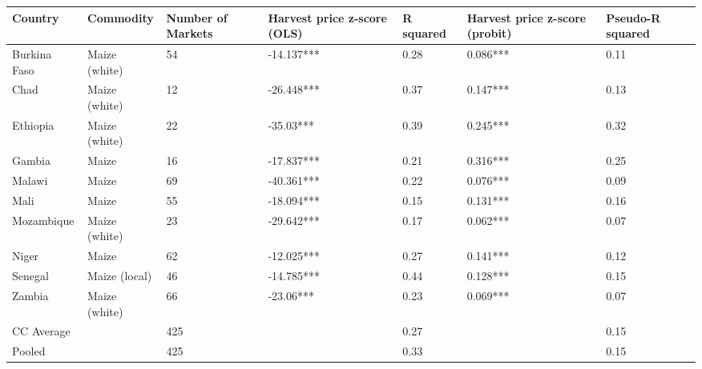 \begin{table}[ht]
\centering
\begin{tabular}{lllllll}
  \hline
Country & Commodity & Number of Markets & Harvest price z-score (OLS) & R squared & Harvest price z-score (probit) & Pseudo-R squared \\ 
  \hline
Burkina Faso & Maize (white) & 54 & -14.137*** & 0.28 & 0.086*** & 0.11 \\ 
  Chad & Maize (white) & 12 & -26.448*** & 0.37 & 0.147*** & 0.13 \\ 
  Ethiopia & Maize (white) & 22 & -35.03*** & 0.39 & 0.245*** & 0.32 \\ 
  Gambia & Maize & 16 & -17.837*** & 0.21 & 0.316*** & 0.25 \\ 
  Malawi & Maize & 69 & -40.361*** & 0.22 & 0.076*** & 0.09 \\ 
  Mali & Maize & 55 & -18.094*** & 0.15 & 0.131*** & 0.16 \\ 
  Mozambique & Maize (white) & 23 & -29.642*** & 0.17 & 0.062*** & 0.07 \\ 
  Niger & Maize & 62 & -12.025*** & 0.27 & 0.141*** & 0.12 \\ 
  Senegal & Maize (local) & 46 & -14.785*** & 0.44 & 0.128*** & 0.15 \\ 
  Zambia & Maize (white) & 66 & -23.06*** & 0.23 & 0.069*** & 0.07 \\ 
  CC Average &  & 425 &  & 0.27 &  & 0.15 \\ 
  Pooled &  & 425 &  & 0.33 &  & 0.15 \\ 
   \hline
\end{tabular}
\end{table}
